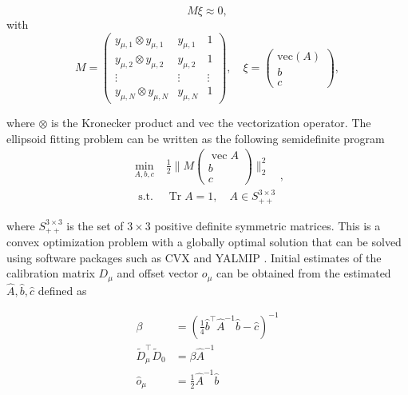 \begin{equation}
	M \xi \approx 0,
\end{equation}
with
\begin{equation}
	M=\left(\begin{array}{ccc}
		y_{\mu, 1} \otimes y_{\mu, 1} & y_{\mu, 1} & 1 \\
		y_{\mu, 2} \otimes y_{\mu, 2} & y_{\mu, 2} & 1 \\
		\vdots & \vdots & \vdots \\
		y_{\mu, N} \otimes y_{\mu, N} & y_{\mu, N} & 1
	\end{array}\right), \quad \xi=\left(\begin{array}{c}
		\mathrm{vec} (A) \\
		b \\
		c
	\end{array}\right),
\end{equation}

where $\otimes$ is the Kronecker product and vec the vectorization operator.
The ellipsoid fitting problem can be written as the following semidefinite program \cite{Kok2016} 
\begin{equation}
	\begin{array}{ll}
		\min _{A, b, c} & \frac{1}{2}\|M\left(\begin{array}{c}
			\operatorname{vec} A \\
			b \\
			c
		\end{array}\right)\|_{2}^{2} \\
		\text { s.t. } & \operatorname{Tr} A=1, \quad A \in S_{++}^{3 \times 3}
	\end{array},
\end{equation}

where $S_{++}^{3 \times 3}$ is the set of $3 \times 3$ positive definite symmetric matrices. This is a convex optimization problem with a globally optimal solution that can be solved using software packages such as CVX \cite{cvx} and YALMIP \cite{Lofberg2004}. Initial estimates of the calibration matrix $D_\mu$ and offset vector $o_\mu$ can be obtained from the estimated $\widehat{A}, \widehat{b}, \widehat{c}$ defined as

\begin{subequations}
	\begin{align}
		\beta &=\left(\frac{1}{4} \hat{b}^{\top} \widehat{A}^{-1} \widehat{b}-\widehat{c}\right)^{-1} \\
		\widetilde{D}_{\mu}^{\top} \widetilde{D}_{0} &=\beta \widehat{A}^{-1} \\
		\widehat{o}_{\mu} &=\frac{1}{2} \widehat{A}^{-1} \widehat{b}
	\end{align}
\end{subequations}

